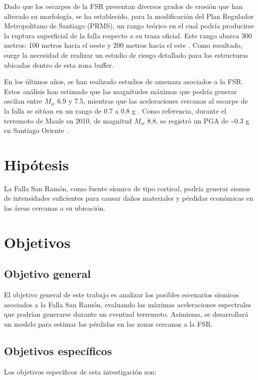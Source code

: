 Dado que los escarpes de la FSR presentan diversos grados de erosión que han alterado su morfología, se ha establecido, para la modificación del Plan Regulador Metropolitano de Santiago (PRMS), un rango teórico en el cual podría producirse la ruptura superficial de la falla respecto a su traza oficial. Este rango abarca 300 metros: 100 metros hacia el oeste y 200 metros hacia el este . Como resultado, surge la necesidad de realizar un estudio de riesgo detallado para las estructuras ubicadas dentro de esta zona buffer.

En los últimos años, se han realizado estudios de amenaza asociados a la FSR. Estos análisis han estimado que las magnitudes máximas que podría generar oscilan entre $M_w$ 6.9 y 7.5, mientras que las aceleraciones cercanas al escarpe de la falla se sitúan en un rango de 0.7 a 0.8 g . Como referencia, durante el terremoto de Maule en 2010, de magnitud $M_w$ 8.8, se registró un PGA de \textasciitilde 0.3 g en Santiago Oriente .

\section{Hipótesis}

La Falla San Ramón, como fuente sísmica de tipo cortical, podría generar sismos de intensidades suficientes para causar daños materiales y pérdidas económicas en las áreas cercanas a su ubicación.

\section{Objetivos}
\subsection{Objetivo general}

El objetivo general de este trabajo es analizar los posibles escenarios sísmicos asociados a la Falla San Ramón, evaluando las máximas aceleraciones espectrales que podrían generarse durante un eventual terremoto. Asimismo, se desarrollará un modelo para estimar las pérdidas en las zonas cercanas a la FSR.

\subsection{Objetivos específicos}

Los objetivos específicos de esta investigación son:

